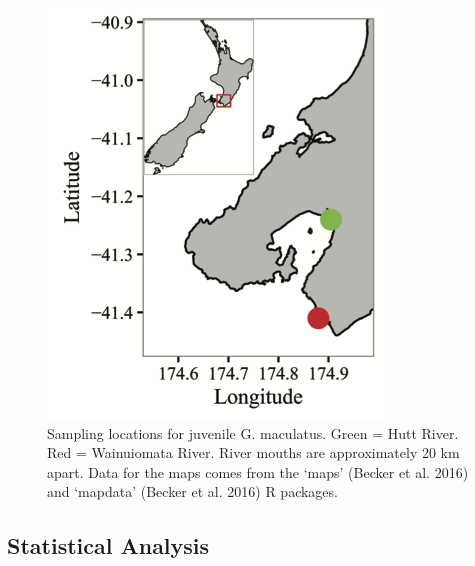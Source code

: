 \documentclass[]{book}
\begin{document}
\begin{figure}
\centering
\includegraphics{images/nz_map.png}
\caption{\label{fig:nzmap}Sampling locations for juvenile G. maculatus.
Green = Hutt River. Red = Wainuiomata River. River mouths are
approximately 20 km apart. Data for the maps comes from the `maps'
(Becker et al. 2016) and `mapdata' (Becker et al. 2016) R packages.}
\end{figure}

\subsection{Statistical Analysis}\label{statistical-analysis}
\end{document}
